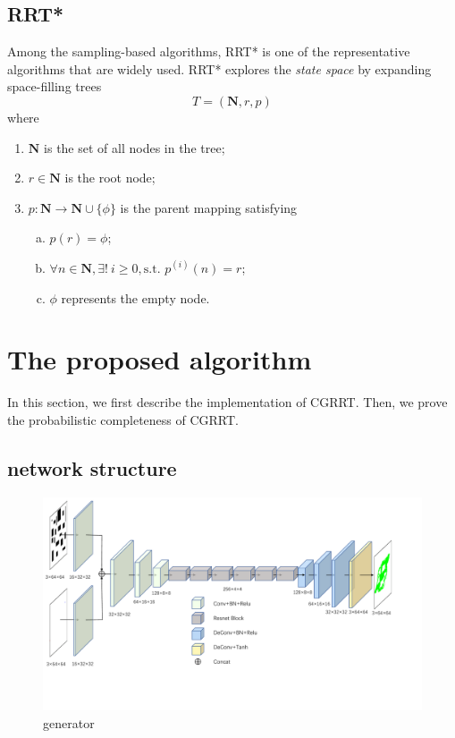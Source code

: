 \documentclass[smallcondensed]{svjour3}     %
\begin{document}
\subsection{RRT*}\label{subsection: rrt-star}
Among the sampling-based algorithms, RRT* is one of the representative algorithms that are widely used.
RRT* explores the \emph{state space} by expanding space-filling trees
\begin{equation}\label{equation: space-filling trees}
	T = (\mathbf{N}, r, p)
\end{equation}
where
\begin{enumerate}[1)]
	\item $\mathbf{N}$ is the set of all nodes in the tree;
	\item $r \in \mathbf{N}$ is the root node;
	\item $p: \mathbf{N} \to \mathbf{N} \cup \{\phi\}$ is the parent mapping satisfying
	\begin{enumerate}[a)]
		\item $p(r) = \phi$;
		\item $\forall n \in \mathbf{N}, \exists ! \ i \geq 0, \textrm{s.t. } p^{(i)}(n) =r$;
		\item $\phi$ represents the empty node.
	\end{enumerate}
\end{enumerate}

\section{The proposed algorithm}
In this section, we first describe the implementation of CGRRT.
Then, we prove the probabilistic completeness of CGRRT.

\subsection{network structure}


\begin{figure}
\centering
\includegraphics[scale=0.3]{network-generator.pdf}%
\caption{generator}     
\label{fig:generator}
\end{figure}
\end{document}
